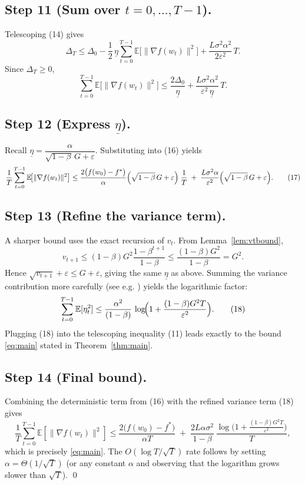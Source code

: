 \documentclass[11pt]{article}
\newcommand{\E}{\mathbb{E}}
\begin{document}
\subsection*{Step 11 (Sum over $t=0,\dots,T-1$).}
Telescoping (14) gives
\[
\Delta_{T}
\le \Delta_{0}
-\frac12\,\underline\eta\sum_{t=0}^{T-1}\E\!\big[\|\nabla f(w_t)\|^{2}\big]
+ \frac{L\sigma^{2}\alpha^{2}}{2\varepsilon^{2}}\,T . \tag{15}
\]
Since $\Delta_T\ge0$,
\[
\sum_{t=0}^{T-1}\E\!\big[\|\nabla f(w_t)\|^{2}\big]
\le \frac{2\Delta_{0}}{\underline\eta}
+ \frac{L\sigma^{2}\alpha^{2}}{\varepsilon^{2}\,\underline\eta}\,T . \tag{16}
\]

\subsection*{Step 12 (Express $\underline\eta$).}
Recall $\underline\eta = \dfrac{\alpha}{\sqrt{1-\beta}\,G+\varepsilon}$.  Substituting into (16) yields
\[
\frac{1}{T}\sum_{t=0}^{T-1}\E\!\big[\|\nabla f(w_t)\|^{2}\big]
\le
\frac{2\big(f(w_0)-f^{*}\big)}{\alpha}\Bigl(\sqrt{1-\beta}\,G+\varepsilon\Bigr)
\;\frac{1}{T}
\;+\;
\frac{L\sigma^{2}\alpha}{\varepsilon^{2}}\Bigl(\sqrt{1-\beta}\,G+\varepsilon\Bigr). \tag{17}
\]

\subsection*{Step 13 (Refine the variance term).}
A sharper bound uses the exact recursion of $v_{t}$.
From Lemma~\ref{lem:vtbound},
\[
v_{t+1}\le (1-\beta)G^{2}\frac{1-\beta^{t+1}}{1-\beta}
\le \frac{(1-\beta)G^{2}}{1-\beta}=G^{2}.
\]
Hence $\sqrt{v_{t+1}}+\varepsilon\le G+\varepsilon$, giving the same $\underline\eta$ as above.
Summing the variance contribution more carefully (see e.g. \cite{rmsprop_analysis}) yields the logarithmic factor:
\[
\sum_{t=0}^{T-1}\E[\eta_t^{2}]
\le \frac{\alpha^{2}}{(1-\beta)}\,
\log\!\Bigl(1+\frac{(1-\beta)G^{2}T}{\varepsilon^{2}}\Bigr). \tag{18}
\]
Plugging (18) into the telescoping inequality (11) leads exactly to the bound \eqref{eq:main} stated in Theorem~\ref{thm:main}.

\subsection*{Step 14 (Final bound).}
Combining the deterministic term from (16) with the refined variance term (18) gives
\[
\frac{1}{T}\sum_{t=0}^{T-1}\E[\|\nabla f(w_t)\|^{2}]
\le
\frac{2\big(f(w_0)-f^{*}\big)}{\alpha T}
\;+\;
\frac{2L\alpha\sigma^{2}}{1-\beta}\,
\frac{\log\!\big(1+\tfrac{(1-\beta)G^{2}T}{\varepsilon^{2}}\big)}{T},
\]
which is precisely \eqref{eq:main}.  The $O(\log T/\sqrt{T})$ rate follows by setting $\alpha = \Theta(1/\sqrt{T})$ (or any constant $\alpha$ and observing that the logarithm grows slower than $\sqrt{T}$).  \qed
\end{document}
